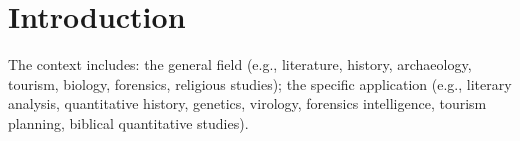 \section{Introduction}
\label{introduction}

The context includes: the general field (e.g., literature, history,
archaeology, tourism, biology, forensics, religious studies); the
specific application (e.g., literary analysis, quantitative history,
genetics, virology, forensics intelligence, tourism planning, biblical
quantitative studies).
